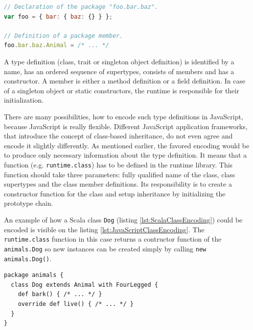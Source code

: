 \documentclass[12pt,a4paper]{report}
\begin{document}
\begin{minipage}{\linewidth}
\begin{lstlisting}[language=JavaScript,caption={Packages in JavaScript.},label={lst:JavaScriptPackages}]
// Declaration of the package "foo.bar.baz".
var foo = { bar: { baz: {} } };

// Definition of a package member.
foo.bar.baz.Animal = /* ... */
\end{lstlisting}
\end{minipage}

A type definition (class, trait or singleton object definition) is identified by a name, has an ordered sequence of supertypes, consists of members and has a constructor. A member is either a method definition or a field definition. In case of a singleton object or static constructors, the runtime is responsible for their initialization.

There are many possibilities, how to encode such type definitions in JavaScript, because JavaScript is really flexible. Different JavaScript application frameworks, that introduce the concept of class-based inheritance, do not even agree and encode it slightly differently. As mentioned earlier, the favored encoding would be to produce only necessary information about the type definition. It means that a function (e.g. \texttt{runtime.class}) has to be defined in the runtime library. This function should take three parameters: fully qualified name of the class, class supertypes and the class member definitions. Its responsibility is to create a constructor function for the class and setup inheritance by initializing the prototype chain. 

An example of how a Scala class \texttt{Dog} (listing \ref{lst:ScalaClassEncoding}) could be encoded is visible on the listing \ref{lst:JavaScriptClassEncoding}. The \texttt{runtime.class} function in this case returns a contructor function of the \texttt{animals.Dog} so new instances can be created simply by calling \texttt{new animals.Dog()}.

\begin{minipage}{\linewidth}
\begin{lstlisting}[caption={Scala \texttt{Dog} class example.},label={lst:ScalaClassEncoding}]
package animals {
  class Dog extends Animal with FourLegged {
    def bark() { /* ... */ }
    override def live() { /* ... */ }
  }
}
\end{lstlisting}
\end{minipage}
\end{document}
